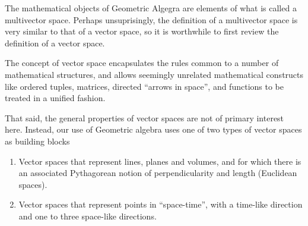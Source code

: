 The mathematical objects of Geometric Algegra are elements of what is called a multivector space.  Perhaps unsuprisingly, the definition of a multivector space is very similar to that of a vector space, so it is worthwhile to first review the definition of a vector space.


The concept of vector space encapsulates the rules common to a number of mathematical structures, and allows seemingly unrelated mathematical constructs like ordered tuples, matrices, directed ``arrows in space'', and functions to be treated in a unified fashion.  

That said, the general properties of vector spaces are not of primary interest here.  Instead, 
our use of Geometric algebra uses one of two types of vector spaces as building blocks

\begin{enumerate}
\item Vector spaces that represent lines, planes and volumes, and for which there is an associated Pythagorean notion of perpendicularity and length (Euclidean spaces).
\item Vector spaces that represent points in ``space-time'', with a time-like direction and one to three space-like directions.
\end{enumerate}

